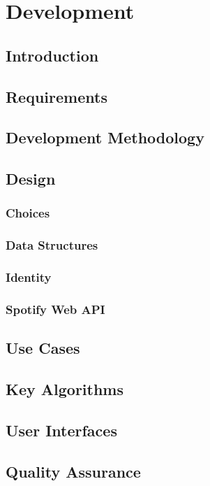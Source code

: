 \chapter{Development}
\section{Introduction}

\section{Requirements}

\section{Development Methodology}

\section{Design}
\subsection{Choices}


\subsection{Data Structures}



\subsection{Identity}

\subsection{Spotify Web API}

\section{Use Cases}

\section{Key Algorithms}

\section{User Interfaces}

\section{Quality Assurance}

